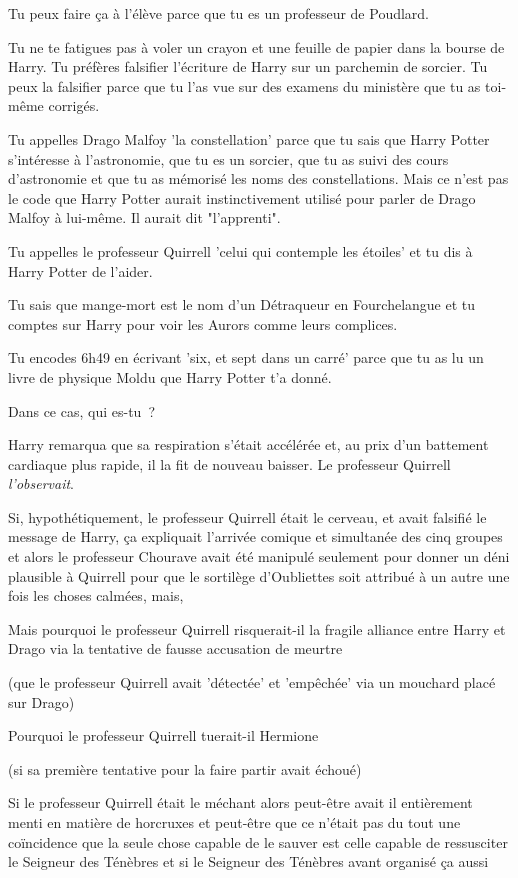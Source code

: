 Tu peux faire ça à l'élève parce que tu es un professeur de Poudlard.

Tu ne te fatigues pas à voler un crayon et une feuille de papier dans la bourse de Harry. Tu préfères falsifier l'écriture de Harry sur un parchemin de sorcier. Tu peux la falsifier parce que tu l'as vue sur des examens du ministère que tu as toi-même corrigés.

Tu appelles Drago Malfoy 'la constellation' parce que tu sais que Harry Potter s'intéresse à l'astronomie, que tu es un sorcier, que tu as suivi des cours d'astronomie et que tu as mémorisé les noms des constellations. Mais ce n'est pas le code que Harry Potter aurait instinctivement utilisé pour parler de Drago Malfoy à lui-même. Il aurait dit "l'apprenti".

Tu appelles le professeur Quirrell 'celui qui contemple les étoiles' et tu dis à Harry Potter de l'aider.

Tu sais que mange-mort est le nom d'un Détraqueur en Fourchelangue et tu comptes sur Harry pour voir les Aurors comme leurs complices.

Tu encodes 6h49 en écrivant 'six, et sept dans un carré' parce que tu as lu un livre de physique Moldu que Harry Potter t'a donné.

Dans ce cas, qui es-tu~?

Harry remarqua que sa respiration s'était accélérée et, au prix d'un battement cardiaque plus rapide, il la fit de nouveau baisser. Le professeur Quirrell \emph{l'observait}.

Si, hypothétiquement, le professeur Quirrell était le cerveau, et avait falsifié le message de Harry, ça expliquait l'arrivée comique et simultanée des cinq groupes et alors le professeur Chourave avait été manipulé seulement pour donner un déni plausible à Quirrell pour que le sortilège d'Oubliettes soit attribué à un autre une fois les choses calmées, mais,

Mais pourquoi le professeur Quirrell risquerait-il la fragile alliance entre Harry et Drago via la tentative de fausse accusation de meurtre

(que le professeur Quirrell avait 'détectée' et 'empêchée' via un mouchard placé sur Drago)

Pourquoi le professeur Quirrell tuerait-il Hermione

(si sa première tentative pour la faire partir avait échoué)

Si le professeur Quirrell était le méchant alors peut-être avait il entièrement menti en matière de horcruxes et peut-être que ce n'était pas du tout une coïncidence que la seule chose capable de le sauver est celle capable de ressusciter le Seigneur des Ténèbres et si le Seigneur des Ténèbres avant organisé ça aussi

